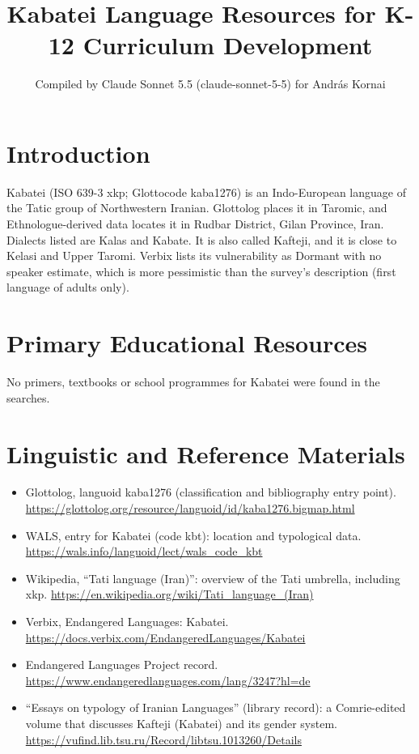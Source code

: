 \documentclass[12pt]{article}
\title{Kabatei Language Resources for K-12 Curriculum Development}
\author{Compiled by Claude Sonnet 5.5 (claude-sonnet-5-5) for Andr\'as Kornai}
\date{}
\begin{document}
\maketitle

\section{Introduction}
Kabatei (ISO 639-3 xkp; Glottocode kaba1276) is an Indo-European language of the Tatic group of Northwestern Iranian. Glottolog places it in Taromic, and Ethnologue-derived data locates it in Rudbar District, Gilan Province, Iran. Dialects listed are Kalas and Kabate. It is also called Kafteji, and it is close to Kelasi and Upper Taromi. Verbix lists its vulnerability as Dormant with no speaker estimate, which is more pessimistic than the survey's description (first language of adults only).

\section{Primary Educational Resources}
No primers, textbooks or school programmes for Kabatei were found in the searches.

\section{Linguistic and Reference Materials}
\begin{itemize}
\item Glottolog, languoid kaba1276 (classification and bibliography entry point). \url{https://glottolog.org/resource/languoid/id/kaba1276.bigmap.html}
\item WALS, entry for Kabatei (code kbt): location and typological data. \url{https://wals.info/languoid/lect/wals_code_kbt}
\item Wikipedia, ``Tati language (Iran)'': overview of the Tati umbrella, including xkp. \url{https://en.wikipedia.org/wiki/Tati_language_(Iran)}
\item Verbix, Endangered Languages: Kabatei. \url{https://docs.verbix.com/EndangeredLanguages/Kabatei}
\item Endangered Languages Project record. \url{https://www.endangeredlanguages.com/lang/3247?hl=de}
\item ``Essays on typology of Iranian Languages'' (library record): a Comrie-edited volume that discusses Kafteji (Kabatei) and its gender system. \url{https://vufind.lib.tsu.ru/Record/libtsu.1013260/Details}
\end{itemize}
\end{document}
